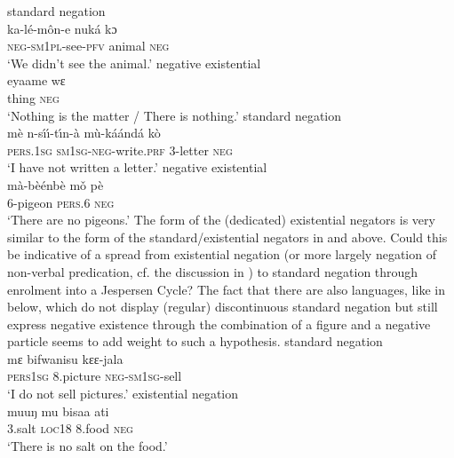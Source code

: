 \documentclass[output=paper]{langsci/langscibook}
\begin{document}
%
\ea\label{ex:tiene-animal-nothing}
%
\ea standard negation\\
\gll ka-l{\'e}-m{\^o}n-e nuk\'a kɔ\\
	\textsc{neg-sm1pl}-see-\textsc{pfv} animal \textsc{neg}\\
\glt `We didn’t see the animal.'
%
\ex negative existential\\
\gll eyaame wɛ\\
	thing \textsc{neg}\\
\glt 	`Nothing is the matter / There is nothing.'
\z\z
%
\ea\label{ex:beembe-letter-pigeon}
%
\ea standard negation\\
\gll m\`e n-s\'\i\'\i-t{\'\i}n-\`a m\`u-k{\'a\'a}nd\'a k\`o\\
	\textsc{pers.1sg}  \textsc{sm1sg-neg}{}-write.\textsc{prf}    3-letter      \textsc{neg}\\
\glt 	`I have not written a letter.'
%
\ex negative existential\\
\gll m{\`a}-b{\`e\'e}nb\`e mǒ p\`e\\
	6-pigeon \textsc{pers}.6 \textsc{neg}\\
\glt 	`There are no pigeons.'
\z\z
%
The form of the (dedicated) existential negators is very similar to the
form of the standard\slash existential negators in  and  above. Could this be indicative of a spread from existential negation (or more largely negation of non-verbal predication, cf. the discussion in ) to standard negation through enrolment into a Jespersen Cycle? The fact that there are also languages, like  in  below, which do not display (regular) discontinuous standard negation but still express negative existence through the combination of a figure and a negative particle seems to add weight to such a hypothesis. 
%
\ea\label{ex:dzing-climb-salt}
%
\ea standard negation\\
\gll mɛ bifwanisu kɛɛ-jala\\
	\textsc{pers1sg} 8.picture \textsc{neg-sm1sg}-sell\\
\glt 	`I do not sell pictures.'
%
\ex existential negation\\
\gll	muuŋ mu bisaa    ati\\
      3.salt    \textsc{loc18} 8.food \textsc{neg}\\
\glt 	`There is no salt on the food.'
\end{document}
